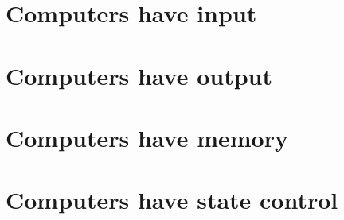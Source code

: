 \section{Computers have input}
\section{Computers have output}
\section{Computers have memory}
\section{Computers have state control}

